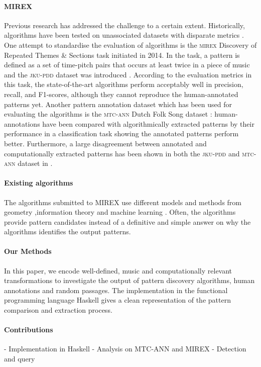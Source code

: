 \documentclass[acmsmall,review,anonymous]{acmart}\settopmatter{printfolios=true,printccs=false,printacmref=false}
\begin{document}
\paragraph{MIREX}
Previous research has addressed the challenge to a certain extent. Historically, algorithms have been tested on unassociated datasets with disparate metrics \cite{janssen2013finding}. One attempt to standardise the evaluation of algorithms is the \textsc{mirex} Discovery of Repeated Themes \& Sections task initiated in 2014. In the task, a pattern is defined as a set of time-pitch pairs that occurs at least twice in a piece of music and the \textsc{jku-pdd} dataset was introduced \cite{collins2013discovery}. According to the evaluation metrics in this task, the state-of-the-art algorithms perform acceptably well in precision, recall, and F1-scores, although they cannot reproduce the human-annotated patterns yet. Another pattern annotation dataset which has been used for evaluating the algorithms is the \textsc{mtc-ann} Dutch Folk Song dataset \cite{van2016meertens}: human-annotations have been compared with algorithmically extracted patterns by their performance in a classification task \cite{boot2016evaluating} showing the annotated patterns perform better. Furthermore, a large disagreement between annotated and computationally extracted patterns has been shown in both the \textsc{jku-pdd} and \textsc{mtc-ann} dataset in \cite{ren2017search,ren2018}.


\paragraph{Existing algorithms}
The algorithms submitted to MIREX use different models and methods from geometry
\cite{},information theory \cite{} and machine learning \cite{}. Often, the
algorithms provide pattern candidates instead of a definitive and
simple answer on why the algorithms identifies the output patterns.

\paragraph{Our Methods} In this paper, we encode well-defined, music and
computationally relevant transformations to investigate the output of pattern
discovery algorithms, human annotations and random passages. The implementation
in the functional programming language Haskell gives a clean representation of
the pattern comparison and extraction process.

\paragraph{Contributions}
- Implementation in Haskell
- Analysis on MTC-ANN and MIREX
- Detection and query
\end{document}
